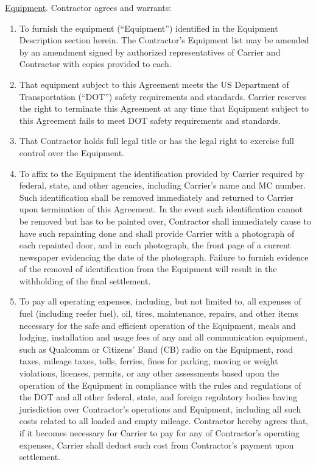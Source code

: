 \underline{Equipment}. Contractor agrees and warrants:
\begin{enumerate}[
    ref = \SecondLevelEnumerator
]
    \item To furnish the equipment (``Equipment'') identified in the
    Equipment Description section herein. The Contractor's Equipment list
    may be amended by an amendment signed by authorized representatives of
    Carrier and Contractor with copies provided to each.

    \item That equipment subject to this Agreement meets the US Department
    of Transportation (``DOT'') safety requirements and standards. Carrier
    reserves the right to terminate this Agreement at any time that
    Equipment subject to this Agreement fails to meet DOT safety
    requirements and standards.

    \item That Contractor holds full legal title or has the legal right to
    exercise full control over the Equipment.

    \item{\label{terms:equipment-identification}} To affix to the Equipment
    the identification provided by Carrier required by federal, state, and
    other agencies, including Carrier's name and MC number. Such
    identification shall be removed immediately and returned to Carrier
    upon termination of this Agreement. In the event such identification
    cannot be removed but has to be painted over, Contractor shall
    immediately cause to have such repainting done and shall provide
    Carrier with a photograph of each repainted door, and in each
    photograph, the front page of a current newspaper evidencing the date
    of the photograph. Failure to furnish evidence of the removal of
    identification from the Equipment will result in the withholding of the
    final settlement.

    \item To pay all operating expenses, including, but not limited to, all
    expenses of fuel (including reefer fuel), oil, tires, maintenance,
    repairs, and other items necessary for the safe and efficient operation
    of the Equipment, meals and lodging, installation and usage fees of any
    and all communication equipment, such as Qualcomm or Citizens' Band
    (CB) radio on the Equipment, road taxes, mileage taxes, tolls, ferries,
    fines for parking, moving or weight violations, licenses, permits, or
    any other assessments based upon the operation of the Equipment in
    compliance with the rules and regulations of the DOT and all other
    federal, state, and foreign regulatory bodies having jurisdiction over
    Contractor's operations and Equipment, including all such costs related
    to all loaded and empty mileage. Contractor hereby agrees that, if it
    becomes necessary for Carrier to pay for any of Contractor's operating
    expenses, Carrier shall deduct such cost from Contractor's payment upon
    settlement.
    

\end{enumerate}
